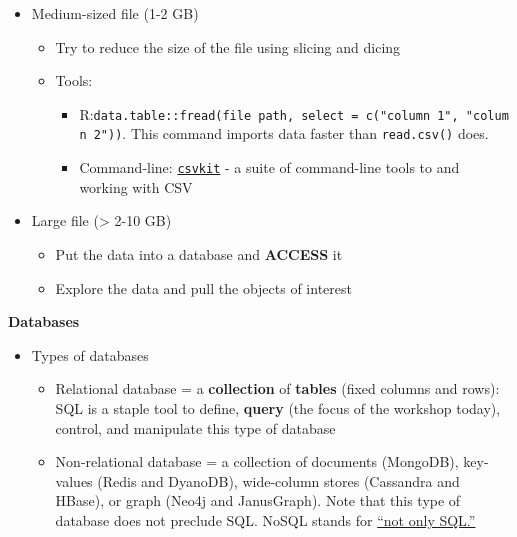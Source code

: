 \documentclass[
]{book}
\providecommand{\tightlist}{%
  \setlength{\itemsep}{0pt}\setlength{\parskip}{0pt}}
\begin{document}
\begin{itemize}
\tightlist
\item
  Medium-sized file (1-2 GB)

  \begin{itemize}
  \tightlist
  \item
    Try to reduce the size of the file using slicing and dicing
  \item
    Tools:

    \begin{itemize}
    \tightlist
    \item
      R:\texttt{data.table::fread(file\ path,\ select\ =\ c("column\ 1",\ "column\ 2"))}. This command imports data faster than \texttt{read.csv()} does.
    \item
      Command-line: \href{https://csvkit.readthedocs.io/en/latest/}{\texttt{csvkit}} - a suite of command-line tools to and working with CSV
    \end{itemize}
  \end{itemize}
\item
  Large file (\textgreater{} 2-10 GB)

  \begin{itemize}
  \tightlist
  \item
    Put the data into a database and \textbf{ACCESS} it
  \item
    Explore the data and pull the objects of interest
  \end{itemize}
\end{itemize}

\textbf{Databases}

\begin{itemize}
\tightlist
\item
  Types of databases

  \begin{itemize}
  \tightlist
  \item
    Relational database = a \textbf{collection} of \textbf{tables} (fixed columns and rows): SQL is a staple tool to define, \textbf{query} (the focus of the workshop today), control, and manipulate this type of database
  \item
    Non-relational database = a collection of documents (MongoDB), key-values (Redis and DyanoDB), wide-column stores (Cassandra and HBase), or graph (Neo4j and JanusGraph). Note that this type of database does not preclude SQL. NoSQL stands for \href{https://www.mongodb.com/nosql-explained}{``not only SQL.''}
  \end{itemize}
\end{itemize}
\end{document}
